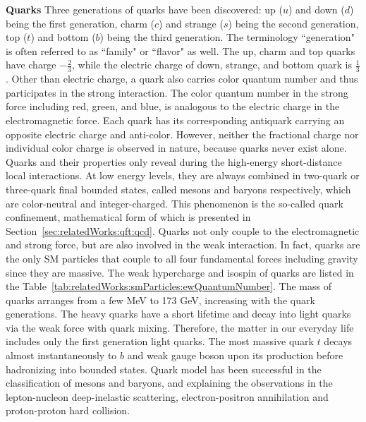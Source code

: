 \noindent \textbf{Quarks} Three generations of quarks have been discovered: up ($u$) and down ($d$) being the first generation, charm ($c$) and strange ($s$) being the second generation, top ($t$) and bottom ($b$) being the third generation. The terminology ``generation" is often referred to as ``family" or ``flavor" as well. The up, charm and top quarks have charge $-\frac{2}{3}$, while the electric charge of down, strange, and bottom quark is $\frac{1}{3}$. Other than electric charge, a quark also carries color quantum number and thus participates in the strong interaction. The color quantum number in the strong force including red, green, and blue, is analogous to the electric charge in the electromagnetic force. Each quark has its corresponding antiquark carrying an opposite electric charge and anti-color. However, neither the fractional charge nor individual color charge is observed in nature, because quarks never exist alone. Quarks and their properties only reveal during the high-energy short-distance local interactions. At low energy levels, they are always combined in two-quark or three-quark final bounded states, called mesons and baryons respectively, which are color-neutral and integer-charged. This phenomenon is the so-called quark confinement, mathematical form of which is presented in Section~\ref{sec:relatedWorks:qft:qcd}. Quarks not only couple to the electromagnetic and strong force, but are also involved in the weak interaction. In fact, quarks are the only SM particles that couple to all four fundamental forces including gravity since they are massive. The weak hypercharge and isospin of quarks are listed in the Table~\ref{tab:relatedWorks:smParticles:ewQuantumNumber}. The mass of quarks arranges from a few MeV to 173 GeV, increasing with the quark generations. The heavy quarks have a short lifetime and decay into light quarks via the weak force with quark mixing. Therefore, the matter in our everyday life includes only the first generation light quarks. The most massive quark $t$ decays almost instantaneously to $b$ and weak gauge boson upon its production before hadronizing into bounded states. Quark model has been successful in the classification of mesons and baryons, and explaining the observations in the lepton-nucleon deep-inelastic scattering, electron-positron annihilation and proton-proton hard collision.



